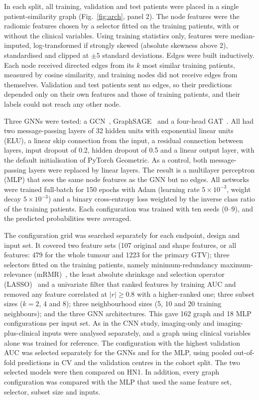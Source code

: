 \documentclass[pdflatex,iicol,sn-nature]{sn-jnl}
\begin{document}
In each split, all training, validation and test patients were placed in a single patient-similarity graph (Fig.~\ref{fig:arch}, panel 2). The node features were the radiomic features chosen by a selector fitted on the training patients, with or without the clinical variables. Using training statistics only, features were median-imputed, log-transformed if strongly skewed (absolute skewness above 2), standardised and clipped at $\pm5$ standard deviations. Edges were built inductively. Each node received directed edges from its $k$ most similar training patients, measured by cosine similarity, and training nodes did not receive edges from themselves. Validation and test patients sent no edges, so their predictions depended only on their own features and those of training patients, and their labels could not reach any other node.

Three GNNs were tested: a GCN~\cite{kipf2017gcn}, GraphSAGE~\cite{hamilton2017graphsage} and a four-head GAT~\cite{velickovic2018gat}. All had two message-passing layers of 32 hidden units with exponential linear units (ELU), a linear skip connection from the input, a residual connection between layers, input dropout of 0.2, hidden dropout of 0.5 and a linear output layer, with the default initialisation of PyTorch Geometric. As a control, both message-passing layers were replaced by linear layers. The result is a multilayer perceptron (MLP) that sees the same node features as the GNN but no edges. All networks were trained full-batch for 150 epochs with Adam (learning rate $5\times10^{-3}$, weight decay $5\times10^{-3}$) and a binary cross-entropy loss weighted by the inverse class ratio of the training patients. Each configuration was trained with ten seeds (0--9), and the predicted probabilities were averaged.

The configuration grid was searched separately for each endpoint, design and input set. It covered two feature sets (107 original and shape features, or all features: 479 for the whole tumour and 1223 for the primary GTV); three selectors fitted on the training patients, namely minimum-redundancy maximum-relevance (mRMR)~\cite{peng2005mrmr}, the least absolute shrinkage and selection operator (LASSO)~\cite{tibshirani1996lasso} and a univariate filter that ranked features by training AUC and removed any feature correlated at $|r|\geq0.8$ with a higher-ranked one; three subset sizes ($k=2$, 4 and 8); three neighbourhood sizes (5, 10 and 20 training neighbours); and the three GNN architectures. This gave 162 graph and 18 MLP configurations per input set. As in the CNN study, imaging-only and imaging-plus-clinical inputs were analysed separately, and a graph using clinical variables alone was trained for reference. The configuration with the highest validation AUC was selected separately for the GNNs and for the MLP, using pooled out-of-fold predictions in CV and the validation centres in the cohort split. The two selected models were then compared on HN1. In addition, every graph configuration was compared with the MLP that used the same feature set, selector, subset size and inputs.
\end{document}
